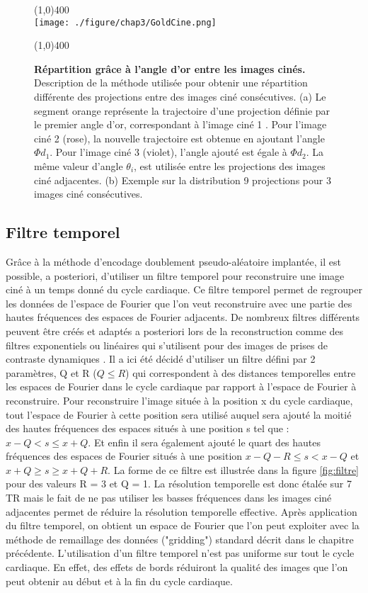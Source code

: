 \begin{figure}[H]
\centering \line(1,0){400} \\
\texttt{[image: ./figure/chap3/GoldCine.png]}
\caption[Répartition grâce à l'angle d'or entre les images cinés.]{\label{fig:GoldCine} \textbf{Répartition grâce à l'angle d'or entre les images cinés.} Description de la méthode utilisée pour obtenir une répartition différente des projections entre des images ciné consécutives. (a) Le segment orange représente la trajectoire d'une projection définie par le premier angle d'or, correspondant à l'image ciné 1 . Pour l'image ciné 2 (rose), la nouvelle trajectoire est obtenue en ajoutant l'angle $\Phi d_1$. Pour l'image ciné 3 (violet), l'angle ajouté est égale à $\Phi d_2$. La même valeur d'angle $\theta_i$, est utilisée entre les projections des images ciné adjacentes. (b) Exemple sur la distribution 9 projections pour 3 images ciné consécutives.}
\line(1,0){400} \\ \end{figure}

\subsection{Filtre temporel}

Grâce à la méthode d’encodage doublement pseudo-aléatoire implantée, il est possible, a posteriori, d’utiliser un filtre temporel pour reconstruire une image ciné à un temps donné du cycle cardiaque. Ce filtre temporel permet de regrouper les données de l'espace de Fourier que l'on veut reconstruire avec une partie des hautes fréquences des espaces de Fourier adjacents. De nombreux filtres différents peuvent être créés et adaptés a posteriori lors de la reconstruction comme des filtres exponentiels ou linéaires qui s'utilisent pour des images de prises de contraste dynamiques \cite{Lin:2008uq}.
Il a ici été décidé d'utiliser un filtre défini par 2 paramètres, Q et R ($Q \leq R$) qui correspondent à des distances temporelles entre les espaces de Fourier dans le cycle cardiaque par rapport à l'espace de Fourier à reconstruire. Pour reconstruire l'image située à la position x du cycle cardiaque, tout l'espace de Fourier à cette position sera utilisé auquel sera ajouté la moitié des hautes fréquences des espaces situés à une position s tel que : $x-Q < s \leq x+Q$. Et enfin il sera également ajouté le quart des hautes fréquences des espaces de Fourier situés à une position $x-Q-R \leq s < x-Q$ et $x+Q \geq s \geq x+Q+R$. La forme de ce filtre est illustrée dans la figure \ref{fig:filtre} pour des valeurs R = 3 et Q = 1.
La résolution temporelle est donc étalée sur 7 TR mais le fait de ne pas utiliser les basses fréquences dans les images ciné adjacentes permet de réduire la résolution temporelle effective.
Après application du filtre temporel, on obtient un espace de Fourier que l'on peut exploiter avec la méthode de remaillage des données ("gridding") standard décrit dans le chapitre précédente.
L'utilisation d'un filtre temporel n'est pas uniforme sur tout le cycle cardiaque. En effet, des effets de bords réduiront la qualité des images que l'on peut obtenir au début et à la fin du cycle cardiaque.

